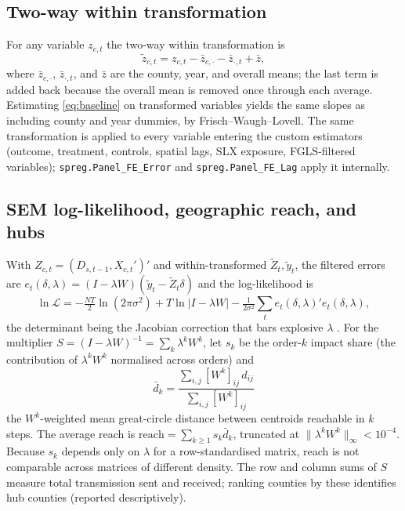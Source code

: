 \subsection{Two-way within transformation}
\label{app:within}
For any variable $z_{c,t}$ the two-way within transformation is
\begin{equation}
  \tilde z_{c,t}=z_{c,t}-\bar z_{c,\cdot}-\bar z_{\cdot,t}+\bar z,
  \label{eq:within}
\end{equation}
where $\bar z_{c,\cdot}$, $\bar z_{\cdot,t}$, and $\bar z$ are the county, year, and
overall means; the last term is added back because the overall mean is removed once
through each average. Estimating \eqref{eq:baseline} on transformed variables yields
the same slopes as including county and year dummies, by Frisch--Waugh--Lovell. The
same transformation is applied to every variable entering the custom estimators
(outcome, treatment, controls, spatial lags, SLX exposure, FGLS-filtered
variables); \texttt{spreg.Panel\_FE\_Error} and \texttt{spreg.Panel\_FE\_Lag} apply it
internally.

\subsection{SEM log-likelihood, geographic reach, and hubs}
\label{app:semmult}
With $Z_{c,t}=(D_{s,t-1},X_{c,t}')'$ and within-transformed $\tilde Z_t,\tilde y_t$,
the filtered errors are $e_t(\delta,\lambda)=(I-\lambda W)(\tilde y_t-\tilde Z_t\delta)$
and the log-likelihood is
\begin{equation}
  \ln\mathcal L=-\tfrac{NT}{2}\ln(2\pi\sigma^2)+T\ln|I-\lambda W|
  -\tfrac{1}{2\sigma^2}\textstyle\sum_t e_t(\delta,\lambda)'e_t(\delta,\lambda),
  \label{eq:semll}
\end{equation}
the determinant being the Jacobian correction that bars explosive $\lambda$
\citep{anselin1988}. For the multiplier $S=(I-\lambda W)^{-1}=\sum_k\lambda^kW^k$, let
$s_k$ be the order-$k$ impact share (the contribution of $\lambda^kW^k$ normalised
across orders) and
\begin{equation}
  \bar d_k=\frac{\sum_{i,j}[W^k]_{ij}\,d_{ij}}{\sum_{i,j}[W^k]_{ij}}
\end{equation}
the $W^k$-weighted mean great-circle distance between centroids reachable in $k$
steps. The average reach is $\text{reach}=\sum_{k\geq 1}s_k\bar d_k$, truncated at
$\lVert\lambda^kW^k\rVert_\infty<10^{-4}$. Because $s_k$ depends only on $\lambda$
for a row-standardised matrix, reach is not comparable across matrices of different
density. The row and column sums of $S$ measure
total transmission sent and received; ranking counties by these identifies hub
counties (reported descriptively).

